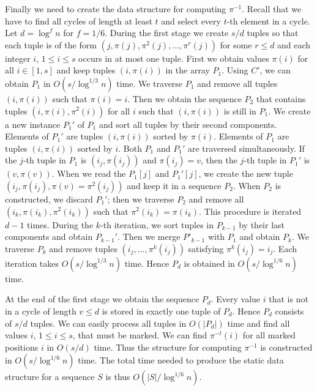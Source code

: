 \documentclass[11pt]{article}\usepackage{fullpage}
\begin{document}
Finally we need to create the data structure for computing $\pi^{-1}$. Recall that we have to find all cycles of length at least $t$ and select every $t$-th element in a cycle. 
Let $d=\log^fn$ for $f=1/6$. During the first stage we create $s/d$ tuples so that each tuple is of the form $(j,\pi(j),\pi^2(j),\ldots,\pi^r(j))$ for some $r\le d$ and each integer $i$, $1\le i\le s$ occurs in at most one tuple. 
First we obtain values $\pi(i)$ for all $i\in [1,s]$ and keep tuples 
$(i,\pi(i))$ in the array $P_1$. Using $C'$, we can obtain $P_1$ in $O(s/\log^{1/3}n)$ time. We traverse $P_1$ and remove all tuples 
$(i,\pi(i))$ such that $\pi(i)=i$. Then we obtain the sequence $P_2$ 
that contains tuples $(i,\pi(i),\pi^2(i))$ for all $i$ such that $(i,\pi(i))$ 
is still in $P_1$. We create a new instance $P_1'$ of $P_1$ and sort all tuples by their second components. Elements of $P_1'$ are tuples $(i,\pi(i))$ sorted by $\pi(i)$. Elements of $P_1$ are  tuples $(i,\pi(i))$ sorted by $i$. Both $P_1$ and $P_1'$ are traversed simultaneously. 
If the $j$-th tuple in $P_1$ is $(i_j,\pi(i_j))$ and $\pi(i_j)=v$, then the
$j$-th tuple in $P_1'$ is $(v,\pi(v))$. When we read the $P_1[j]$ and $P_1'[j]$, we create the new tuple $(i_j,\pi(i_j),\pi(v)=\pi^2(i_j))$ and keep it in a sequence $P_2$. When $P_2$ is constructed, we discard $P_1'$;
then we traverse $P_2$ and remove all $(i_k,\pi(i_k),\pi^2(i_k))$ such that 
$\pi^2(i_k)=\pi(i_k)$. This procedure is iterated $d-1$ times. During the $k$-th iteration, we sort tuples in $P_{k-1}$ by their last components and obtain $P_{k-1}'$. Then we merge $P'_{k-1}$ with $P_1$ and obtain $P_k$. 
We traverse $P_k$ and remove tuples $(i_j,\ldots,\pi^k(i_j))$ satisfying 
$\pi^k(i_j)=i_j$. Each iteration takes $O(s/\log^{1/3}n)$ time. Hence $P_d$ 
is obtained in $O(s/\log^{1/6}n)$ time. 

 

At the end of the first stage we obtain the sequence $P_d$. Every value 
$i$ that is not in a cycle of length $v\le d$ is stored in exactly one tuple of $P_d$. Hence $P_d$ consists of $s/d$ tuples. We can easily process all tuples in $O(|P_d|)$ time and find all values $i$, $1\le i\le s$, that 
must be marked. We can find $\pi^{-t}(i)$ for all marked positions $i$ in $O(s/d)$ time. Thus the structure for computing $\pi^{-1}$ is constructed in $O(s/\log^{1/6}n)$ time. The total time needed to produce the static data structure for a sequence $S$ is thus $O(|S|/\log^{1/6}n)$.
\end{document}
